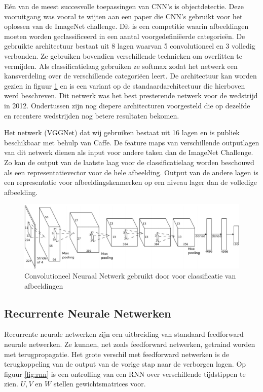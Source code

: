 E\'en van de meest succesvolle toepassingen van CNN's is objectdetectie. Deze vooruitgang was vooral te wijten aan een paper\cite{Krizhevsky2012a} die CNN's gebruikt voor het oplossen van de ImageNet challenge.\cite{Russakovsky2014}
Dit is een competitie waarin afbeeldingen moeten worden geclassificeerd in een aantal voorgedefini\"eerde categorie\"en. De gebruikte architectuur bestaat uit 8 lagen waarvan 5 convolutioneel en 3 volledig verbonden. Ze gebruiken bovendien verschillende technieken om overfitten te vermijden. Als classificatielaag gebruiken ze softmax zodat het netwerk een kansverdeling over de verschillende categori\"een leert. De architectuur kan worden gezien in figuur \ref{fig:AlexNet} en  is een variant op de standaardarchitectuur die hierboven werd beschreven. Dit netwerk was het best presterende netwerk voor de wedstrijd in 2012. Ondertussen zijn nog diepere architecturen voorgesteld die op dezelfde en recentere wedstrijden nog betere resultaten bekomen.

Het netwerk (VGGNet)\cite{Arge2015} dat wij gebruiken bestaat uit 16 lagen en is publiek beschikbaar met behulp van Caffe\cite{Jia2014}. De feature maps van verschillende outputlagen van dit netwerk dienen als input voor andere taken dan de ImageNet Challenge. Zo kan de output van de laatste laag voor de classificatielaag worden beschouwd als een representatievector voor de hele afbeelding. Output van de andere lagen is een representatie voor afbeeldingskenmerken op een niveau lager dan de volledige afbeelding.
\begin{figure}[tb]
	\centering
	\includegraphics[width=\linewidth]{Images/cnn.PNG}
	\caption{Convolutioneel Neuraal Netwerk gebruikt door \cite{Krizhevsky2012a} voor classificatie van afbeeldingen}
	\label{fig:AlexNet}
\end{figure}

\subsection{Recurrente Neurale Netwerken}
Recurrente neurale netwerken zijn een uitbreiding van standaard feedforward neurale netwerken. Ze kunnen, net zoals feedforward netwerken, getraind worden met terugpropagatie. Het grote verschil met feedforward netwerken is de terugkoppeling van de output van de vorige stap naar de verborgen lagen. Op figuur \ref{fig:rnn}  is een ontrolling van een RNN over verschillende tijdstippen te zien. $U,V$ en $W$ stellen gewichtsmatrices voor.

